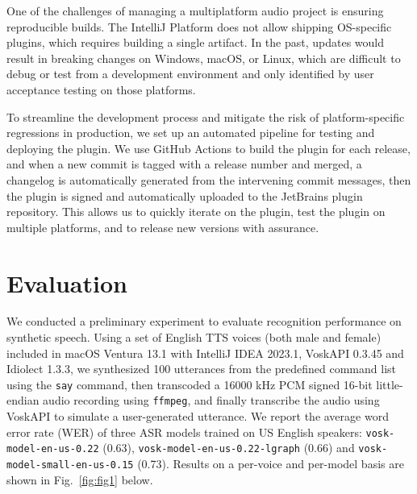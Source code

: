 \documentclass[conference]{IEEEtran}
\begin{document}
One of the challenges of managing a multiplatform audio project is ensuring reproducible builds. The IntelliJ Platform does not allow shipping OS-specific plugins, which requires building a single artifact. In the past, updates would result in breaking changes on Windows, macOS, or Linux, which are difficult to debug or test from a development environment and only identified by user acceptance testing on those platforms.

To streamline the development process and mitigate the risk of platform-specific regressions in production, we set up an automated pipeline for testing and deploying the plugin. We use GitHub Actions to build the plugin for each release, and when a new commit is tagged with a release number and merged, a changelog is automatically generated from the intervening commit messages, then the plugin is signed and automatically uploaded to the JetBrains plugin repository. This allows us to quickly iterate on the plugin, test the plugin on multiple platforms, and to release new versions with assurance.

\section{Evaluation}

We conducted a preliminary experiment to evaluate recognition performance on synthetic speech. Using a set of English TTS voices (both male and female) included in macOS Ventura 13.1 with IntelliJ IDEA 2023.1, VoskAPI 0.3.45 and Idiolect 1.3.3, we synthesized 100 utterances from the predefined command list using the \texttt{say} command, then transcoded a 16000 kHz PCM signed 16-bit little-endian audio recording using \texttt{ffmpeg}, and finally transcribe the audio using VoskAPI to simulate a user-generated utterance. We report the average word error rate (WER) of three ASR models trained on US English speakers: \texttt{vosk-model-en-us-0.22} (0.63), \texttt{vosk-model-en-us-0.22-lgraph} (0.66) and \texttt{vosk-model-small-en-us-0.15} (0.73). Results on a per-voice and per-model basis are shown in  Fig.~\ref{fig:fig1} below.
\end{document}
